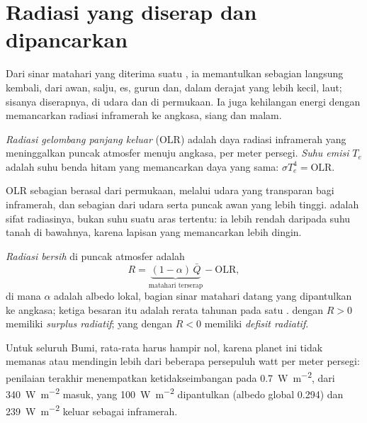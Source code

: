 \section{Radiasi yang diserap dan dipancarkan}\label{sec:b1:radiation-heat-transport:toa}

Dari sinar matahari yang diterima suatu , ia memantulkan sebagian langsung kembali, dari awan, salju, es, gurun dan, dalam derajat yang lebih kecil, laut; sisanya diserapnya, di udara dan di permukaan. Ia juga kehilangan energi dengan memancarkan radiasi inframerah ke angkasa, siang dan malam.

\begin{definition}\label{def:b1:radiation-heat-transport:olr}
\emph{Radiasi gelombang panjang keluar} (OLR)
adalah daya radiasi inframerah yang meninggalkan puncak atmosfer menuju angkasa, per
meter persegi. \emph{Suhu emisi} $T_e$ adalah suhu benda hitam yang
memancarkan daya yang sama: $\sigma T_e^4 = \text{OLR}$.
\end{definition}

OLR sebagian berasal dari permukaan, melalui udara yang transparan bagi inframerah, dan
sebagian dari udara serta puncak awan yang lebih tinggi.  adalah sifat
radiasinya, bukan suhu suatu aras tertentu: ia lebih rendah daripada suhu tanah di
bawahnya, karena lapisan yang memancarkan lebih dingin.

\begin{definition}\label{def:b1:radiation-heat-transport:net-radiation}
\emph{Radiasi bersih} di puncak atmosfer adalah
\[
  R = \underbrace{(1 - \alpha)\,\bar Q}_{\text{matahari terserap}} - \text{OLR},
\]
di mana $\alpha$ adalah albedo lokal, bagian sinar matahari datang yang dipantulkan ke angkasa; ketiga besaran itu adalah rerata tahunan pada satu .  dengan $R > 0$ memiliki \emph{surplus radiatif}; yang dengan $R < 0$ memiliki \emph{defisit radiatif}.
\end{definition}

Untuk seluruh Bumi,  rata-rata harus hampir nol, karena planet ini tidak memanas atau mendingin lebih dari beberapa persepuluh watt per meter persegi: penilaian terakhir menempatkan ketidakseimbangan pada \qty{0.7}{W.m^{-2}}, dari \qty{340}{W.m^{-2}} masuk, yang \qty{100}{W.m^{-2}} dipantulkan (albedo global
\num{0.294}) dan \qty{239}{W.m^{-2}} keluar sebagai inframerah.

